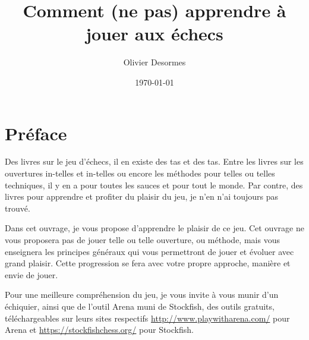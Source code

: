 \documentclass[a5paper,openany,twocolumn]{book}%
\begin{document}
 \setcounter{page}{1} 
\frontmatter
\title{Comment (ne pas) apprendre à jouer aux échecs}
\author{Olivier Desormes}
\date{\today}
\maketitle \thispagestyle{empty}

\onecolumn

\newpage
\strut
\newpage

\twocolumn

\tableofcontents \thispagestyle{empty}


\onecolumn

\newpage \thispagestyle{empty}
\strut
\newpage \thispagestyle{empty}

\twocolumn



\onecolumn

\chapter{Préface}\thispagestyle{empty}

Des livres sur le jeu d'échecs, il en existe des tas et des tas. Entre les livres sur les ouvertures in-telles et in-telles ou encore les méthodes pour telles ou telles techniques, il y en a pour toutes les sauces et pour tout le monde. Par contre, des livres pour apprendre et profiter du plaisir du jeu, je n'en n'ai toujours pas trouvé.

Dans cet ouvrage, je vous propose d'apprendre le plaisir de ce jeu. Cet ouvrage ne vous proposera pas de jouer telle ou telle ouverture, ou méthode, mais vous enseignera les principes généraux qui vous permettront de jouer et évoluer avec grand plaisir. Cette progression se fera avec votre propre approche, manière et envie de jouer.

Pour une meilleure compréhension du jeu, je vous invite à vous munir d'un échiquier, ainsi que de l'outil Arena muni de Stockfish, des outils gratuits, téléchargeables sur leurs sites respectifs \href{http://www.playwitharena.com/}{http://www.playwitharena.com/} pour Arena et \href{https://stockfishchess.org/}{https://stockfishchess.org/} pour Stockfish.
\end{document}
